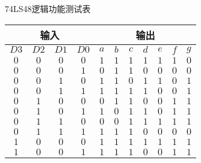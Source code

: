 \documentclass{ctexart}
\begin{document}
    \begin{表}
    	\centering
    	\caption{74LS48逻辑功能测试表}
    	\begin{tabular}{|c|c|c|c|c|c|c|c|c|c|c|}
    		\hline
    		\multicolumn{4}{|c|}{输入} & \multicolumn{7}{|c|}{输出}\\
    		\hline
    		$D3$ & $D2$ & $D1$ & $D0$ & $a$ & $b$ & $c$ & $d$ & $e$ & $f$ & $g$\\
    		\hline
    		$0$ & $0$ & $0$ & $0$ & $1$ & $1$ & $1$ & $1$ & $1$ & $1$ & $0$\\
    		\hline
    		$0$ & $0$ & $0$ & $1$ & $0$ & $1$ & $1$ & $0$ & $0$ & $0$ & $0$\\
    		\hline
    		$0$ & $0$ & $1$ & $0$ & $1$ & $1$ & $0$ & $1$ & $1$ & $0$ & $1$\\
    		\hline
    		$0$ & $0$ & $1$ & $1$ & $1$ & $1$ & $1$ & $1$ & $0$ & $0$ & $1$\\
    		\hline
    		$0$ & $1$ & $0$ & $0$ & $0$ & $1$ & $1$ & $0$ & $0$ & $1$ & $1$\\
    		\hline
    		$0$ & $1$ & $0$ & $1$ & $1$ & $0$ & $1$ & $1$ & $0$ & $1$ & $1$\\
    		\hline
    		$0$ & $1$ & $1$ & $0$ & $0$ & $0$ & $1$ & $1$ & $1$ & $1$ & $1$\\
    		\hline
    		$0$ & $1$ & $1$ & $1$ & $1$ & $1$ & $1$ & $0$ & $0$ & $0$ & $0$\\
    		\hline
    		$1$ & $0$ & $0$ & $0$ & $1$ & $1$ & $1$ & $1$ & $1$ & $1$ & $1$\\
    		\hline
    		$1$ & $0$ & $0$ & $1$ & $1$ & $1$ & $1$ & $0$ & $0$ & $1$ & $1$\\
    		\hline
    	\end{tabular}
    \end{表}
\end{document}
